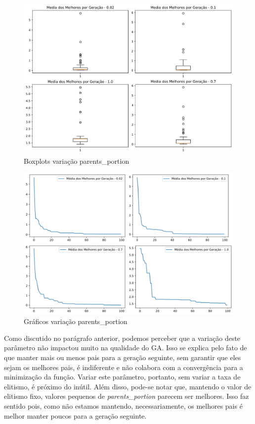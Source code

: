 \documentclass[12pt]{article}
\begin{document}
	\begin{figure}[H]
		\centering
		\includegraphics[width=0.9\linewidth]{Imagens/parentsPortion/boxplotParPor}
		\caption{Boxplots variação parents\_portion}
		\label{fig:boxplotparpor}
	\end{figure}
	\begin{figure}[H]
		\centering
		\includegraphics[width=0.9\linewidth]{Imagens/parentsPortion/graficoParPor}
		\caption{Gráficos variação parents\_portion}
		\label{fig:graficoparpor}
	\end{figure}
	
	Como discutido no parágrafo anterior, podemos perceber que a variação deste parâmetro não impactou muito na qualidade do GA. Isso se explica pelo fato de que manter mais ou menos pais para a geração seguinte, sem garantir que eles sejam os melhores pais, é indiferente e não colabora com a convergência para a minimização da função. Variar este parâmetro, portanto, sem variar a taxa de elitismo, é próximo do inútil. Além disso, pode-se notar que, mantendo o valor de elitismo fixo, valores pequenos de \textit{parents\_portion} parecem ser melhores. Isso faz sentido pois, como não estamos mantendo, necessariamente, os melhores pais é melhor manter poucos para a geração seguinte.
	
\end{document}
